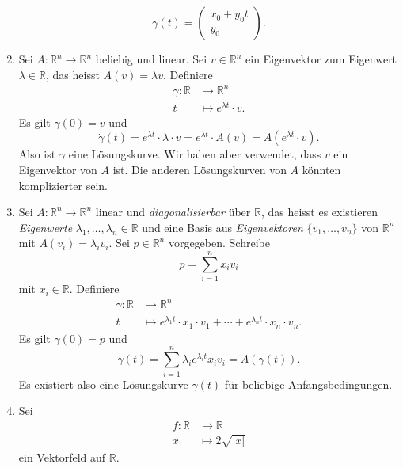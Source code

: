 \documentclass[../main.tex]{subfiles}
\begin{document}
\begin{examples}
\begin{enumerate}[(1)]
      \[
        \gamma(t) =
        \begin{pmatrix}
          x_0 + y_0 t \\
          y_0
        \end{pmatrix}.
      \]
    \item Sei $A \colon \mathbb{R}^n \to \mathbb{R}^n$ 
      beliebig und linear.
      Sei $v \in \mathbb{R}^n$ ein Eigenvektor zum Eigenwert
      $\lambda \in \mathbb{R}$, das heisst
      $A(v) = \lambda v$.
      Definiere
       \begin{align*}
        \gamma \colon \mathbb{R} & \to \mathbb{R}^n \\
        t & \mapsto e^{\lambda t} \cdot v.
      \end{align*}
      Es gilt $\gamma(0) = v$ und
      \[
        \dot \gamma(t) = e^{\lambda t} \cdot \lambda \cdot v
        = e^{\lambda t}  \cdot A(v)
        = A(e^{\lambda t} \cdot v).
      \]
      Also ist $\gamma$ eine Lösungskurve.
      Wir haben aber verwendet, dass $v$ ein Eigenvektor
      von $A$ ist. Die anderen Lösungskurven von $A$ 
      könnten komplizierter sein.
    \item Sei $A \colon \mathbb{R}^n \to \mathbb{R}^n$ 
      linear und \emph{diagonalisierbar} über $\mathbb{R}$,
      das heisst es existieren
      \emph{Eigenwerte} $\lambda_1, \dots, \lambda_n \in \mathbb{R}$ 
      und eine Basis aus \emph{Eigenvektoren}
      $\{v_1, \dots, v_n\}$ von $\mathbb{R}^n$ 
      mit $A(v_i) = \lambda_i v_i$.
      Sei $p \in \mathbb{R}^n$ vorgegeben. Schreibe
      \[
        p = \sum_{i=1}^{n} x_i v_i
      \]
      mit $x_i \in \mathbb{R}$.
      Definiere
      \begin{align*}
        \gamma \colon \mathbb{R} & \to \mathbb{R}^n \\
        t & \mapsto e^{\lambda_1 t} \cdot x_1 \cdot v_1 +
        \cdots
        +
        e^{\lambda_n t} \cdot x_n \cdot v_n.
      \end{align*}
      Es gilt $\gamma(0) = p$ und
      \[
        \dot \gamma(t) = \sum_{i=1}^{n} \lambda_i e^{\lambda_i t}x_i v_i
        = A(\gamma(t)).
      \]
      Es existiert also eine Lösungskurve $\gamma(t)$ 
      für beliebige Anfangsbedingungen.
    \item Sei
      \begin{align*}
        f \colon \mathbb{R} & \to \mathbb{R} \\
        x & \mapsto 2 \sqrt{|x|}
      \end{align*}
      ein Vektorfeld auf $\mathbb{R}$.

\end{enumerate}
\end{examples}
\end{document}
